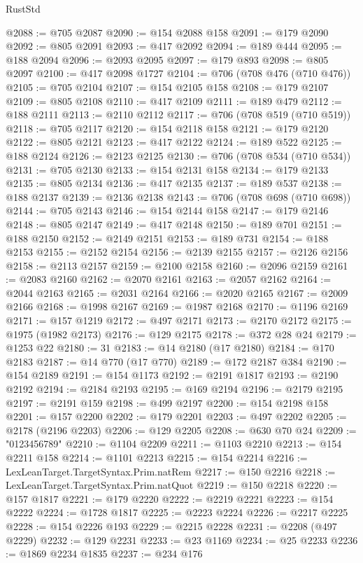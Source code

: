 \begin{lexlean}{RustStd}
\begin{coremodule}
{\begin{coremodule}
{{{{{{{{{{{{{{{{{{{{{{{{{{{{{{{{{{{{{{{@2088 := @705 @2087
@2090 := @154 @2088 @158
@2091 := @179 @2090
@2092 := @805 @2091
@2093 := @417 @2092
@2094 := @189 @444
@2095 := @188 @2094
@2096 := @2093 @2095
@2097 := @179 @893
@2098 := @805 @2097
@2100 := @417 @2098 @1727
@2104 := @706 (@708 @476 (@710 @476))
@2105 := @705 @2104
@2107 := @154 @2105 @158
@2108 := @179 @2107
@2109 := @805 @2108
@2110 := @417 @2109
@2111 := @189 @479
@2112 := @188 @2111
@2113 := @2110 @2112
@2117 := @706 (@708 @519 (@710 @519))
@2118 := @705 @2117
@2120 := @154 @2118 @158
@2121 := @179 @2120
@2122 := @805 @2121
@2123 := @417 @2122
@2124 := @189 @522
@2125 := @188 @2124
@2126 := @2123 @2125
@2130 := @706 (@708 @534 (@710 @534))
@2131 := @705 @2130
@2133 := @154 @2131 @158
@2134 := @179 @2133
@2135 := @805 @2134
@2136 := @417 @2135
@2137 := @189 @537
@2138 := @188 @2137
@2139 := @2136 @2138
@2143 := @706 (@708 @698 (@710 @698))
@2144 := @705 @2143
@2146 := @154 @2144 @158
@2147 := @179 @2146
@2148 := @805 @2147
@2149 := @417 @2148
@2150 := @189 @701
@2151 := @188 @2150
@2152 := @2149 @2151
@2153 := @189 @731
@2154 := @188 @2153
@2155 := @2152 @2154
@2156 := @2139 @2155
@2157 := @2126 @2156
@2158 := @2113 @2157
@2159 := @2100 @2158
@2160 := @2096 @2159
@2161 := @2083 @2160
@2162 := @2070 @2161
@2163 := @2057 @2162
@2164 := @2044 @2163
@2165 := @2031 @2164
@2166 := @2020 @2165
@2167 := @2009 @2166
@2168 := @1998 @2167
@2169 := @1987 @2168
@2170 := @1196 @2169
@2171 := @157 @1219
@2172 := @497 @2171
@2173 := @2170 @2172
@2175 := @1975 (@1982 @2173)
@2176 := @129 @2175
@2178 := @372 @28 @24
@2179 := @1253 @22
@2180 := 31
@2183 := @14 @2180 (@17 @2180)
@2184 := @170 @2183
@2187 := @14 @770 (@17 @770)
@2189 := @172 @2187 @384
@2190 := @154 @2189
@2191 := @154 @1173
@2192 := @2191 @1817
@2193 := @2190 @2192
@2194 := @2184 @2193
@2195 := @169 @2194
@2196 := @2179 @2195
@2197 := @2191 @159
@2198 := @499 @2197
@2200 := @154 @2198 @158
@2201 := @157 @2200
@2202 := @179 @2201
@2203 := @497 @2202
@2205 := @2178 (@2196 @2203)
@2206 := @129 @2205
@2208 := @630 @70 @24
@2209 := "0123456789"
@2210 := @1104 @2209
@2211 := @1103 @2210
@2213 := @154 @2211 @158
@2214 := @1101 @2213
@2215 := @154 @2214
@2216 := LexLeanTarget.TargetSyntax.Prim.natRem
@2217 := @150 @2216
@2218 := LexLeanTarget.TargetSyntax.Prim.natQuot
@2219 := @150 @2218
@2220 := @157 @1817
@2221 := @179 @2220
@2222 := @2219 @2221
@2223 := @154 @2222
@2224 := @1728 @1817
@2225 := @2223 @2224
@2226 := @2217 @2225
@2228 := @154 @2226 @193
@2229 := @2215 @2228
@2231 := @2208 (@497 @2229)
@2232 := @129 @2231
@2233 := @23 @1169
@2234 := @25 @2233
@2236 := @1869 @2234 @1835
@2237 := @234 @176
}}}}}}}}}}}}}}}}}}}}}}}}}}}}}}}}}}}}}}}
\end{coremodule}}
\end{coremodule}
\end{lexlean}

